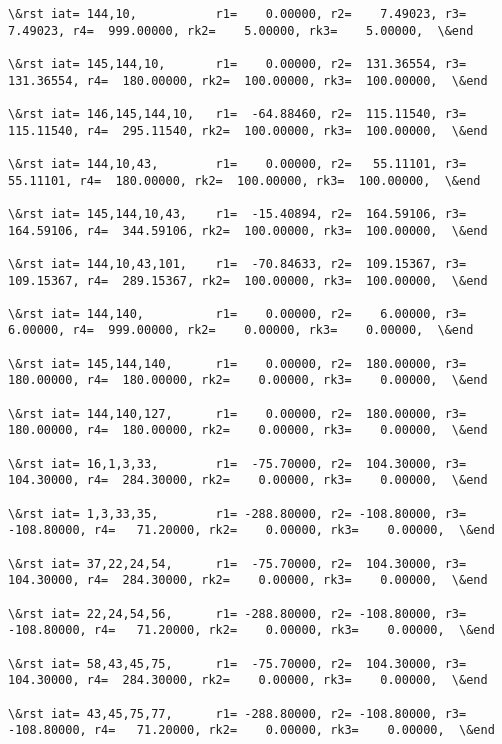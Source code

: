 \documentclass[11pt]{article}
\begin{document}
    \begin{Verbatim}[commandchars=\\\{\}]
\&rst iat= 144,10,           r1=    0.00000, r2=    7.49023, r3=    7.49023, r4=  999.00000, rk2=    5.00000, rk3=    5.00000,  \&end

\&rst iat= 145,144,10,       r1=    0.00000, r2=  131.36554, r3=  131.36554, r4=  180.00000, rk2=  100.00000, rk3=  100.00000,  \&end

\&rst iat= 146,145,144,10,   r1=  -64.88460, r2=  115.11540, r3=  115.11540, r4=  295.11540, rk2=  100.00000, rk3=  100.00000,  \&end

\&rst iat= 144,10,43,        r1=    0.00000, r2=   55.11101, r3=   55.11101, r4=  180.00000, rk2=  100.00000, rk3=  100.00000,  \&end

\&rst iat= 145,144,10,43,    r1=  -15.40894, r2=  164.59106, r3=  164.59106, r4=  344.59106, rk2=  100.00000, rk3=  100.00000,  \&end

\&rst iat= 144,10,43,101,    r1=  -70.84633, r2=  109.15367, r3=  109.15367, r4=  289.15367, rk2=  100.00000, rk3=  100.00000,  \&end

\&rst iat= 144,140,          r1=    0.00000, r2=    6.00000, r3=    6.00000, r4=  999.00000, rk2=    0.00000, rk3=    0.00000,  \&end

\&rst iat= 145,144,140,      r1=    0.00000, r2=  180.00000, r3=  180.00000, r4=  180.00000, rk2=    0.00000, rk3=    0.00000,  \&end

\&rst iat= 144,140,127,      r1=    0.00000, r2=  180.00000, r3=  180.00000, r4=  180.00000, rk2=    0.00000, rk3=    0.00000,  \&end

\&rst iat= 16,1,3,33,        r1=  -75.70000, r2=  104.30000, r3=  104.30000, r4=  284.30000, rk2=    0.00000, rk3=    0.00000,  \&end

\&rst iat= 1,3,33,35,        r1= -288.80000, r2= -108.80000, r3= -108.80000, r4=   71.20000, rk2=    0.00000, rk3=    0.00000,  \&end

\&rst iat= 37,22,24,54,      r1=  -75.70000, r2=  104.30000, r3=  104.30000, r4=  284.30000, rk2=    0.00000, rk3=    0.00000,  \&end

\&rst iat= 22,24,54,56,      r1= -288.80000, r2= -108.80000, r3= -108.80000, r4=   71.20000, rk2=    0.00000, rk3=    0.00000,  \&end

\&rst iat= 58,43,45,75,      r1=  -75.70000, r2=  104.30000, r3=  104.30000, r4=  284.30000, rk2=    0.00000, rk3=    0.00000,  \&end

\&rst iat= 43,45,75,77,      r1= -288.80000, r2= -108.80000, r3= -108.80000, r4=   71.20000, rk2=    0.00000, rk3=    0.00000,  \&end


\end{Verbatim}
\end{document}
